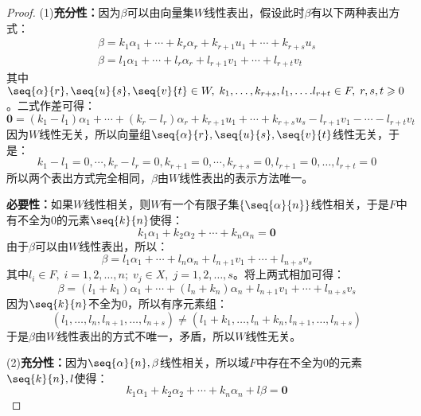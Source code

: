 \begin{proof}
	(1)\textbf{充分性：}因为$\beta$可以由向量集$W$线性表出，假设此时$\beta$有以下两种表出方式：
	\begin{gather*}
		\beta=k_1\alpha_1+\cdots+k_r\alpha_r+k_{r+1}u_1+\cdots+k_{r+s}u_s \\
		\beta=l_1\alpha_1+\cdots+l_r\alpha_r+l_{r+1}v_1+\cdots+l_{r+t}v_t
	\end{gather*}
	其中$\seq{\alpha}{r},\seq{u}{s},\seq{v}{t}\in W,\;k_1,\dots,k_{r+s},l_1,\dots.l_{r+t}\in F,\;r,s,t\geqslant0$。二式作差可得：
	\begin{equation*}
		\mathbf{0}=(k_1-l_1)\alpha_1+\cdots+(k_r-l_r)\alpha_r+k_{r+1}u_1+\cdots+k_{r+s}u_s-l_{r+1}v_1-\cdots-l_{r+t}v_t
	\end{equation*}
	因为$W$线性无关，所以向量组$\seq{\alpha}{r},\seq{u}{s},\seq{v}{t}$线性无关，于是：
	\begin{equation*}
		k_1-l_1=0,\cdots,k_r-l_r=0,k_{r+1}=0,\cdots,k_{r+s}=0,l_{r+1}=0,\dots,l_{r+t}=0
	\end{equation*}
	所以两个表出方式完全相同，$\beta$由$W$线性表出的表示方法唯一。\par
	\textbf{必要性：}如果$W$线性相关，则$W$有一个有限子集$\{\seq{\alpha}{n}\}$线性相关，于是$F$中有不全为$0$的元素$\seq{k}{n}$使得：
	\begin{equation*}
		k_1\alpha_1+k_2\alpha_2+\cdots+k_n\alpha_n=\mathbf{0}
	\end{equation*}
	由于$\beta$可以由$W$线性表出，所以：
	\begin{equation*}
		\beta=l_1\alpha_1+\cdots+l_n\alpha_n+l_{n+1}v_1+\cdots+l_{n+s}v_s
	\end{equation*}
	其中$l_i\in F,\;i=1,2,\dots,n;\;v_j\in X,\;j=1,2,\dots,s$。将上两式相加可得：
	\begin{equation*}
		\beta=(l_1+k_1)\alpha_1+\cdots+(l_n+k_n)\alpha_n+l_{n+1}v_1+\cdots+l_{n+s}v_s
	\end{equation*}
	因为$\seq{k}{n}$不全为$0$，所以有序元素组：
	\begin{equation*}
		(l_1,\dots,l_n,l_{n+1},\dots,l_{n+s})\ne(l_1+k_1,\dots,l_n+k_n,l_{n+1},\dots,l_{n+s})
	\end{equation*}
	于是$\beta$由$W$线性表出的方式不唯一，矛盾，所以$W$线性无关。\par
	(2)\textbf{充分性：}因为$\seq{\alpha}{n},\beta$线性相关，所以域$F$中存在不全为$0$的元素$\seq{k}{n},l$使得：
	\begin{equation*}
		k_1\alpha_1+k_2\alpha_2+\cdots+k_n\alpha_n+l\beta=\mathbf{0}
	\end{equation*}

\end{proof}
